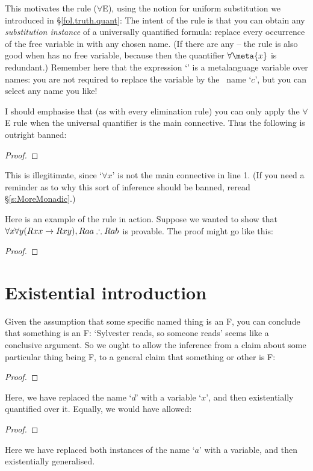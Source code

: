 This motivates the  rule ($\forall$E), using the notion for uniform substitution we introduced in §\ref{fol.truth.quant}:
The intent of the rule is that you can obtain any \emph{substitution instance} of a universally quantified formula: replace every occurrence of the free variable  in  with any chosen name. (If there are any – the rule is also good when  has no free variable, because then the quantifier $\forall\meta{x}$ is redundant.) Remember here that the expression `' is a metalanguage variable over names: you are not required to replace the variable  by the \FOL\ name `$c$', but you can select any name you like!

I should emphasise that (as with every elimination rule) you can only apply the $\forall$E rule when the universal quantifier is the main connective. Thus the following is outright banned:
\begin{proof}
\end{proof}
This is illegitimate, since `$\forall x$' is not the main connective in line 1. (If you need a reminder as to why this sort of inference should be banned, reread §\ref{s:MoreMonadic}.)

Here is an example of the rule in action. Suppose we wanted to show that $\forall x \forall y (Rxx \rightarrow Rxy), Raa  \mathrel{\therefore} Rab$ is provable. The proof might go like this: \begin{proof}
\end{proof}



\section{Existential introduction}\label{exint}
Given the assumption that some specific named thing is an F, you can conclude that something is an F: `Sylvester reads, so someone reads' seems like a conclusive argument. So we ought to allow the inference from a claim about some particular thing being F, to a general claim that something or other is F:
\begin{proof}
	 
\end{proof}
Here, we have replaced the name `$d$' with a variable `$x$', and then existentially quantified over it. Equally, we would have allowed:
\begin{proof}
	 
\end{proof}
Here we have replaced both instances of the name `$a$' with a variable, and then existentially generalised. 

